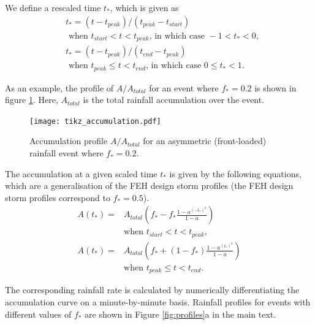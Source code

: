 \documentclass[APA,Times2COL]{WileyNJDv5}
\begin{document}
We define a rescaled time $t_*$, which is given as
\begin{align*}
&t_*=(t-t_{peak})/(t_{peak}-t_{start}) \\ & \textrm{ when } t_{start} <t<t_{peak} \textrm{, in which case } -1<t_*<0, \\
&t_*=(t-t_{peak})/(t_{end}-t_{peak}) \\ & \textrm{ when } t_{peak} \leq t<t_{end} \textrm{, in which case } 0 \leq t_*<1. 
\end{align*}

As an example, the profile of $A/A_{total}$ for an event where $f_*=0.2$ is shown in figure \ref{fig:accprof}. Here, $A_{total}$ is the total rainfall accumulation over the event. 

\begin{figure}
\texttt{[image: tikz\_accumulation.pdf]}
\caption{Accumulation profile $A/A_{total}$ for an asymmetric (front-loaded) rainfall event where $f_*=0.2$.}
\label{fig:accprof}
\end{figure}

The accumulation at a given scaled time $t_*$ is given by the following equations, which are a generalisation of the FEH design storm profiles (the FEH design storm profiles correspond to $f_*=0.5$). 
\begin{align*}
A(t_*) = & A_{total}\left(f_*-f_* \frac{1-a^{(-t_*)^b}}{1-a} \right) \\ & \textrm{when }  t_{start}<t<t_{peak}, \\
A(t_*) = & A_{total}\left(f_*+(1-f_*) \frac{1-a^{(t_*)^b}}{1-a} \right) \\\ & \textrm{when } t_{peak} \leq t<t_{end}.    
\end{align*}

The corresponding rainfall rate is calculated by numerically differentiating the accumulation curve on a minute-by-minute basis. Rainfall profiles for events with different values of $f_*$ are shown in Figure \ref{fig:profiles}a in the main text.

\newpage
\clearpage

\end{document}
